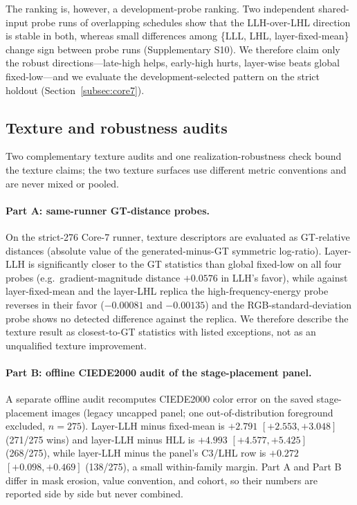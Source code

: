 \documentclass[times,twocolumn,final]{elsarticle}
\begin{document}
The ranking is, however, a development-probe ranking. Two independent
shared-input probe runs of overlapping schedules show that the LLH-over-LHL
direction is stable in both, whereas small differences among
\{LLL, LHL, layer-fixed-mean\} change sign between probe runs
(Supplementary S10). We therefore claim only the robust directions---late-high
helps, early-high hurts, layer-wise beats global fixed-low---and we evaluate
the development-selected pattern on the strict holdout
(Section~\ref{subsec:core7}).

\subsection{Texture and robustness audits}
\label{subsec:texture}

Two complementary texture audits and one realization-robustness check bound
the texture claims; the two texture surfaces use different metric conventions
and are never mixed or pooled.

\paragraph{Part A: same-runner GT-distance probes.}
On the strict-276 Core-7 runner, texture descriptors are evaluated as
GT-relative distances (absolute value of the generated-minus-GT symmetric
log-ratio). Layer-LLH is significantly closer to the GT statistics than
global fixed-low on all four probes (e.g.\ gradient-magnitude distance
$+0.0576$ in LLH's favor), while against layer-fixed-mean and the layer-LHL
replica the high-frequency-energy probe reverses in their favor
($-0.00081$ and $-0.00135$) and the RGB-standard-deviation probe shows no
detected difference against the replica. We therefore describe the texture
result as closest-to-GT statistics with listed exceptions, not as an
unqualified texture improvement.

\paragraph{Part B: offline CIEDE2000 audit of the stage-placement panel.}
A separate offline audit recomputes CIEDE2000 color error on the saved
stage-placement images (legacy uncapped panel; one out-of-distribution
foreground excluded, $n=275$). Layer-LLH minus fixed-mean is
$+2.791$ $[+2.553,+3.048]$ (271/275 wins) and layer-LLH minus HLL is
$+4.993$ $[+4.577,+5.425]$ (268/275), while layer-LLH minus the panel's
C3/LHL row is $+0.272$ $[+0.098,+0.469]$ (138/275), a small within-family
margin. Part A and Part B differ in mask erosion, value convention, and
cohort, so their numbers are reported side by side but never combined.
\end{document}
